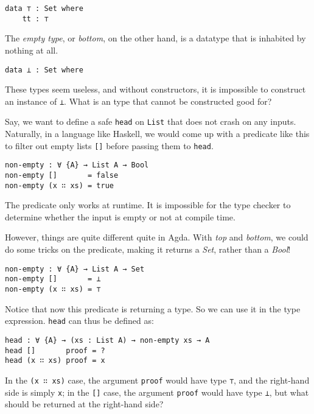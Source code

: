 \documentclass[../thesis.tex]{subfiles}
\begin{document}
\begin{lstlisting}
data ⊤ : Set where
    tt : ⊤
\end{lstlisting}

The \textit{empty type}, or \textit{bottom}, on the other hand, is a datatype
that is inhabited by nothing at all.

\begin{lstlisting}
data ⊥ : Set where
\end{lstlisting}

These types seem useless, and without constructors, it is impossible to
construct an instance of {\lstinline|⊥|}. What is an type that cannot be
constructed good for?

Say, we want to define a safe {\lstinline|head|} on {\lstinline|List|} that
does not crash on any inputs. Naturally, in a language like Haskell,
we would come up with a predicate like this to filter out empty lists
{\lstinline|[]|} before passing them to {\lstinline|head|}.

\begin{lstlisting}
non-empty : ∀ {A} → List A → Bool
non-empty []       = false
non-empty (x ∷ xs) = true
\end{lstlisting}

The predicate only works at runtime. It is impossible for the type
checker to determine whether the input is empty or not at compile time.

However, things are quite different quite in Agda. With \textit{top} and \textit{bottom},
we could do some tricks on the predicate, making it returns a \textit{Set}, rather
than a \textit{Bool}!

\begin{lstlisting}
non-empty : ∀ {A} → List A → Set
non-empty []       = ⊥
non-empty (x ∷ xs) = ⊤
\end{lstlisting}

Notice that now this predicate is returning a type. So we can use it in the type
expression. {\lstinline|head|} can thus be defined as:

\begin{lstlisting}
head : ∀ {A} → (xs : List A) → non-empty xs → A
head []       proof = ?
head (x ∷ xs) proof = x
\end{lstlisting}

In the {\lstinline|(x ∷ xs)|} case, the argument {\lstinline|proof|} would
have type {\lstinline|⊤|}, and the right-hand side is simply {\lstinline|x|};
in the {\lstinline|[]|} case, the argument {\lstinline|proof|} would
have type {\lstinline|⊥|}, but what should be returned at the right-hand side?
\end{document}
